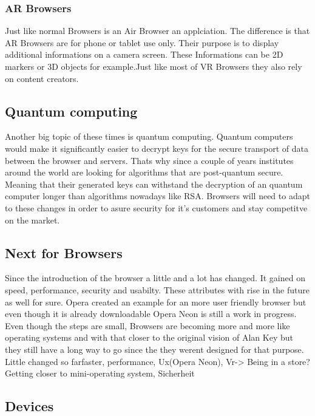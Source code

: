 \documentclass[runningheads]{llncs}
\begin{document}
			\subsubsection{AR Browsers}
			Just like normal Browsers is an Air Browser an applciation. The difference is that AR Browsers are for phone or tablet use only. Their purpose is to display additional informations on a camera screen. These Informations can be 2D markers or 3D objects for example.Just like most of VR Browsers they also rely on content creators. 
		\subsection{Quantum computing}
			Another big topic of these times is quantum computing. Quantum computers would make it significantly easier to decrypt keys for the secure transport of data between the browser and servers. Thats why since a couple of years institutes around the world are looking for algorithms that are post-quantum secure. Meaning that their generated keys can withstand the decryption of an quantum computer longer than algorithms nowadays like RSA. Browsers will need to adapt to these changes in order to asure security for it's customers and stay competitve on the market. 
		\subsection{Next for Browsers}
		Since the introduction of the browser a little and a lot has changed. It gained on speed, performance, security and usabilty. These attributes with rise in the future as well for sure. Opera created an example for an more user friendly browser but even though it is already downloadable Opera Neon is still a work in progress.
		Even though the steps are small, Browsers are becoming more and more like operating systems and with that closer to the original vision of Alan Key but they still have a long way to go since the they werent designed for that purpose.  
		Little changed so farfaster, performance, Ux(Opera Neon), Vr-> Being in a store? Getting closer to mini-operating system, Sicherheit
		\subsection{Devices}
\end{document}
